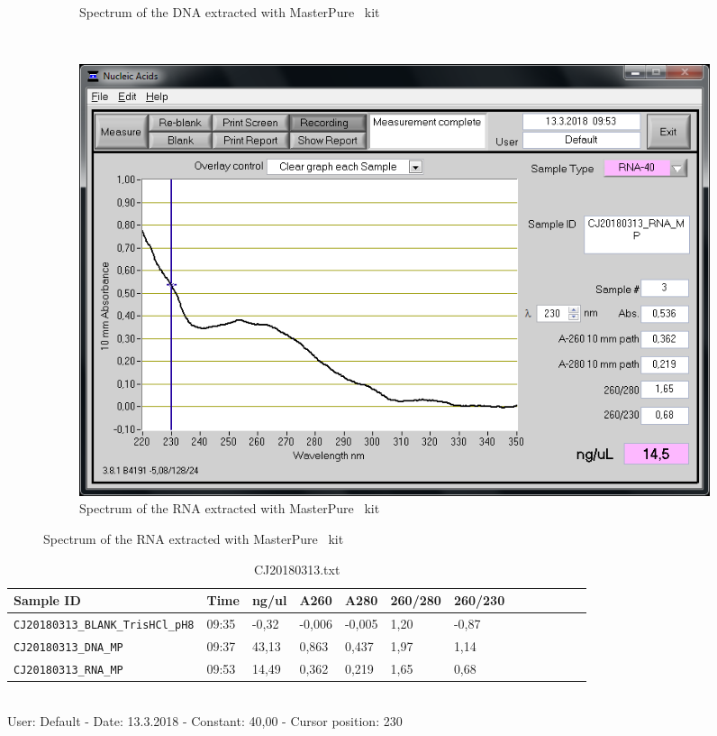 \begin{figure}[H]
\begin{subfigure}[b]{0.3\textwidth}
        \caption{Spectrum of the DNA extracted with MasterPure\texttrademark~ kit}
        \label{sfig:CJ20180313_DNA_MP}
    \end{subfigure}
    ~ 
    \begin{subfigure}[b]{0.3\textwidth}
        \includegraphics[width=\textwidth]{graphics/screenshots/CJ20180313_RNA_MP.png}
        \caption{Spectrum of the RNA extracted with MasterPure\texttrademark~ kit}
        \label{sfig:CJ20180313_RNA_MP}
    \end{subfigure}
\end{figure}

\begin{table}[htbp]
\caption{CJ20180313.txt}
\label{tab:}
\centering
\begin{tabular}{l l l l l l l l l l l l l }
\toprule
Sample ID & Time  & ng/ul  & A260  & A280  & 260/280  & 260/230  \\ \midrule
\texttt{CJ20180313\_BLANK\_TrisHCl\_pH8} & 09:35 & -0,32 & -0,006 & -0,005 & 1,20 & -0,87 \\
\texttt{CJ20180313\_DNA\_MP} & 09:37 & 43,13 & 0,863 & 0,437 & 1,97 & 1,14 \\
\texttt{CJ20180313\_RNA\_MP} & 09:53 & 14,49 & 0,362 & 0,219 & 1,65 & 0,68 \\
\bottomrule
\end{tabular}
\\
User: Default - Date: 13.3.2018 - Constant: 40,00 - Cursor position: 230 \
\end{table}
